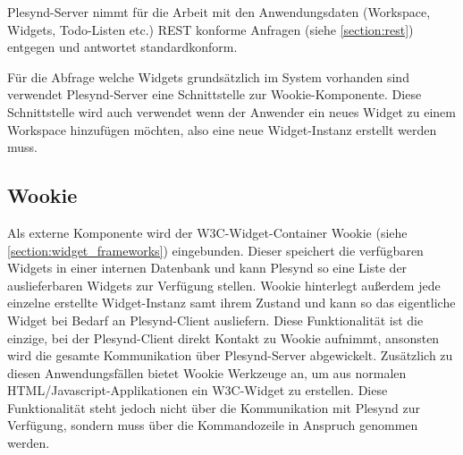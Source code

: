 Plesynd-Server nimmt für die Arbeit mit den Anwendungsdaten (Workspace, Widgets, Todo-Listen etc.) REST konforme Anfragen (siehe \ref{section:rest}) entgegen und antwortet standardkonform.

Für die Abfrage welche Widgets grundsätzlich im System vorhanden sind verwendet Plesynd-Server eine Schnittstelle zur Wookie-Komponente. Diese Schnittstelle wird auch verwendet wenn der Anwender ein neues Widget zu einem Workspace hinzufügen möchten, also eine neue Widget-Instanz erstellt werden muss.

\subsection{Wookie}
Als externe Komponente wird der W3C-Widget-Container Wookie (siehe \ref{section:widget_frameworks}) eingebunden. Dieser speichert die verfügbaren Widgets in einer internen Datenbank und kann Plesynd so eine Liste der auslieferbaren Widgets zur Verfügung stellen. Wookie hinterlegt außerdem jede einzelne erstellte Widget-Instanz samt ihrem Zustand und kann so das eigentliche Widget bei Bedarf an Plesynd-Client ausliefern. Diese Funktionalität ist die einzige, bei der Plesynd-Client direkt Kontakt zu Wookie aufnimmt, ansonsten wird die gesamte Kommunikation über Plesynd-Server abgewickelt. Zusätzlich zu diesen Anwendungsfällen bietet Wookie Werkzeuge an, um aus normalen HTML/Javascript-Applikationen ein W3C-Widget zu erstellen. Diese Funktionalität steht jedoch nicht über die Kommunikation mit Plesynd zur Verfügung, sondern muss über die Kommandozeile in Anspruch genommen werden.

